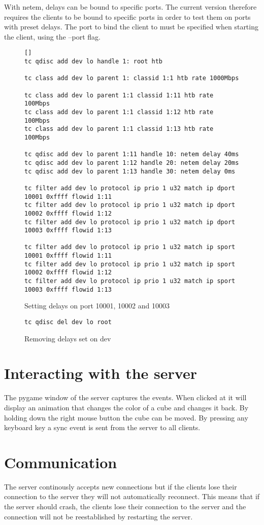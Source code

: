 With netem, delays can be bound to specific ports. The current version therefore requires the clients to be bound to specific ports in order to test them on ports with preset delays. The port to bind the client to must be specified when starting the client, using the --port flag. 

\begin{figure}[h! ]
\begin{verbatim}[]
tc qdisc add dev lo handle 1: root htb

tc class add dev lo parent 1: classid 1:1 htb rate 1000Mbps

tc class add dev lo parent 1:1 classid 1:11 htb rate 100Mbps
tc class add dev lo parent 1:1 classid 1:12 htb rate 100Mbps
tc class add dev lo parent 1:1 classid 1:13 htb rate 100Mbps

tc qdisc add dev lo parent 1:11 handle 10: netem delay 40ms
tc qdisc add dev lo parent 1:12 handle 20: netem delay 20ms
tc qdisc add dev lo parent 1:13 handle 30: netem delay 0ms

tc filter add dev lo protocol ip prio 1 u32 match ip dport 10001 0xffff flowid 1:11
tc filter add dev lo protocol ip prio 1 u32 match ip dport 10002 0xffff flowid 1:12
tc filter add dev lo protocol ip prio 1 u32 match ip dport 10003 0xffff flowid 1:13

tc filter add dev lo protocol ip prio 1 u32 match ip sport 10001 0xffff flowid 1:11
tc filter add dev lo protocol ip prio 1 u32 match ip sport 10002 0xffff flowid 1:12
tc filter add dev lo protocol ip prio 1 u32 match ip sport 10003 0xffff flowid 1:13
\end{verbatim}
\caption{Setting delays on port 10001, 10002 and 10003}
\end{figure}

\begin{figure}[h!]
\begin{verbatim}
tc qdisc del dev lo root
\end{verbatim}
\caption{Removing delays set on dev}
\end{figure}

\section{Interacting with the server}
The pygame window of the server captures the events. When clicked at it will display an animation that changes the color of a cube and changes it back. By holding down the right mouse button the cube can be moved. By pressing any keyboard key a sync event is sent from the server to all clients. 

\section{Communication}
The server continously accepts new connections but if the clients lose their connection to the server they will not automatically reconnect. This means that if the server should crash, the clients lose their connection to the server and the connection will not be reestablished by restarting the server.

